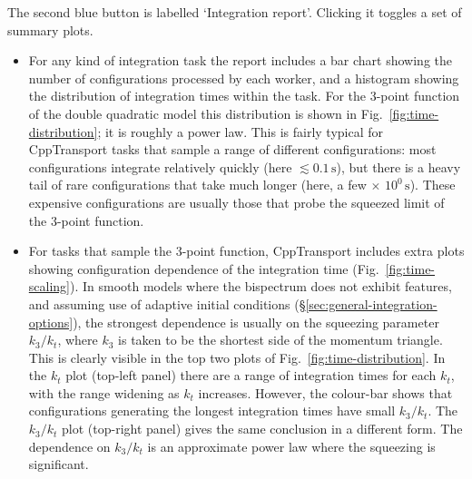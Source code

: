 \documentclass[11pt,a4paper]{article}
\newcommand{\packagefont}{\sffamily}
\newcommand{\CppTransport}{{\packagefont CppTransport}}
\newcommand{\second}{\,\mathrm{s}}
\newcommand{\semibold}[1]{{\fontseries{b}\selectfont{#1}}}
\newcommand{\para}[1]{\par\vspace{2mm}\noindent\semibold{{#1.}---}\ignorespaces}
\begin{document}
\para{Integration report}
The second blue button is labelled `Integration report'.
Clicking it toggles a set of summary plots.
\begin{itemize}
    \item For any kind of integration task the report includes a
    bar chart showing the number of configurations processed by each
    worker, and a histogram showing the distribution of integration times
    within the task.
    For the 3-point function of the double quadratic model
    this distribution is shown in Fig.~\ref{fig:time-distribution};
    it is roughly a power law.
    This is fairly typical for
    {\CppTransport} tasks that sample a range of different configurations:
    most configurations integrate relatively quickly
    (here $\lesssim 0.1 \second$),
    but there is a heavy tail of
    rare configurations
    that take much longer
    (here, a few $\times$ $10^0 \second$).
    These expensive configurations are usually those that probe the
    squeezed limit of the 3-point function.
    
    \item For tasks that sample the 3-point function, {\CppTransport}
    includes extra plots showing configuration dependence of the
    integration time
    (Fig.~\ref{fig:time-scaling}).
    In smooth models where the bispectrum does not exhibit features,
    and assuming use of adaptive initial conditions (\S\ref{sec:general-integration-options}),
    the strongest dependence is usually on the squeezing parameter
    $k_3 / k_t$, where $k_3$
    is taken to be the shortest side of the momentum triangle.
    This is clearly visible in the top two plots of Fig.~\ref{fig:time-distribution}.
    In the $k_t$ plot (top-left panel)
    there are a range of integration times for each $k_t$, with the range
    widening as $k_t$ increases.
    However, the colour-bar shows that configurations generating the longest
    integration times have small $k_3/k_t$.
    The $k_3/k_t$ plot (top-right panel)
    gives the same conclusion in a different form.
    The dependence on $k_3/k_t$ is an approximate power law where the
    squeezing is significant.
\end{itemize}
\end{document}
